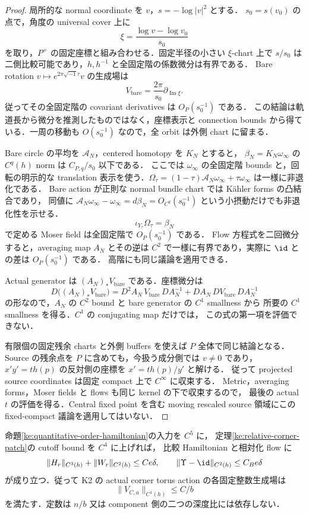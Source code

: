 \begin{proof}
局所的な normal coordinate を $v$，$s=-\log|v|^2$ とする．
$s_0=s(v_0)$ の点で，角度の universal cover 上に
\[
 \xi=\frac{\log v-\log v_0}{s_0}
\]
を取り，$P^+$ の固定座標と組み合わせる．固定半径の小さい $\xi$-chart 上で
$s/s_0$ は二側比較可能であり，$h,h^{-1}$ と全固定階の係数微分は有界である．
Bare rotation $v\mapsto e^{2\pi\sqrt{-1}\tau}v$ の生成場は
\[
 V_{\mathrm{bare}}=\frac{2\pi}{s_0}\partial_{\operatorname{Im}\xi}.
\]
従ってその全固定階の covariant derivatives は $O_P(s_0^{-1})$ である．
この結論は軌道長から微分を推測したものではなく，座標表示と connection bounds
から得ている．一周の移動も $O(s_0^{-1})$ なので，全 orbit は外側 chart に留まる．

Bare circle の平均を $\mathcal A_N$，centered homotopy を $K_N$ とすると，
$\beta_N=K_N\omega_\infty$ の $C^q(h)$ norm は
$C_{P,q}/s_0$ 以下である．
ここでは $\omega_\infty$ の全固定階 bounds と，回転の明示的な translation
表示を使う．$\Omega_\tau=(1-\tau)\mathcal A_N\omega_\infty+
\tau\omega_\infty$ は一様に非退化である．
Bare action が正則な normal bundle chart では K\"ahler forms の凸結合であり，
同値に $\mathcal A_N\omega_\infty-\omega_\infty=d\beta_N=O_{C^q}(s_0^{-1})$
という小摂動だけでも非退化性を示せる．
\[
 \iota_{Y_\tau}\Omega_\tau=\beta_N
\]
で定める Moser field は全固定階で $O_P(s_0^{-1})$ である．
Flow 方程式を二回微分すると，averaging map $A_N$ とその逆は
$C^2$ で一様に有界であり，実際に $\id$ との差は $O_P(s_0^{-1})$ である．
高階にも同じ議論を適用できる．

Actual generator は $(A_N)_*V_{\mathrm{bare}}$ である．座標微分は
\[
 D\bigl((A_N)_*V_{\mathrm{bare}}\bigr)
 =D^2A_N\,V_{\mathrm{bare}}\,DA_N^{-1}
   +DA_N\,DV_{\mathrm{bare}}\,DA_N^{-1}
\]
の形なので，$A_N$ の $C^2$ bound と bare generator の $C^1$ smallness から
所要の $C^1$ smallness を得る．$C^1$ の conjugating map だけでは，
この式の第一項を評価できない．

有限個の固定残余 charts と外側 buffers を使えば $P$ 全体で同じ結論となる．
Source の残余点を $P$ に含めても，今扱う成分側では $v\ne0$ であり，
$x'y'=t h(p)$ の反対側の座標を $x'=t h(p)/y'$ と解ける．
従って projected source coordinates は固定 compact 上で $C^\infty$ に収束する．
Metric，averaging forms，Moser fields と flows も同じ kernel の下で収束するので，
最後の actual $t$ の評価を得る．Central fixed point を含む moving rescaled
source 領域にこの fixed-compact 議論を適用してはいない．
\end{proof}

\begin{lemma}
\label{ke:relative-corner-patch-c2}
命題\ref{ke:quantitative-order-hamiltonian}の入力を $C^5$ に，
定理\ref{ke:relative-corner-patch}の cutoff bound を $C^4$ に上げれば，
比較 Hamiltonian と相対化 flow に
\[
 \|H_r\|_{C^3(h)}+\|W_r\|_{C^2(h)}\le Ce\delta,
 \qquad \|\Upsilon-\id\|_{C^2(h)}\le C_Be\delta
\]
が成り立つ．従って K2 の actual corner torus action の各固定整数生成場は
\[
 \|V_{C,a}\|_{C^1(h)}\le C/b
\]
を満たす．定数は $n/b$ 又は component 側の二つの深度比には依存しない．
\end{lemma}

